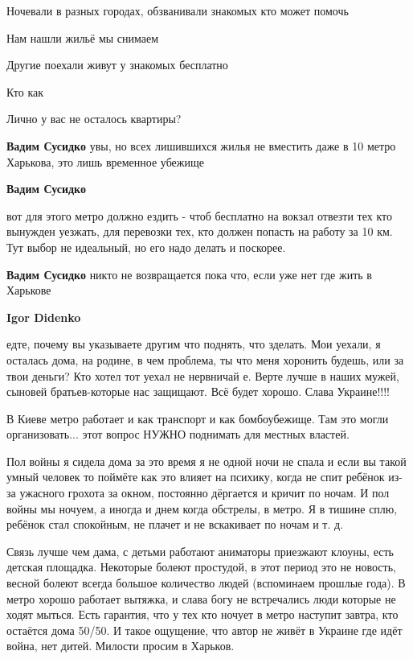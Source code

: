 \begin{itemize}
\begin{itemize}
Ночевали в разных городах, обзванивали знакомых кто может помочь

Нам нашли жильё мы снимаем

Другие поехали живут у знакомых бесплатно

Кто как

Лично у вас не осталось квартиры?

\textbf{Вадим Сусидко} увы, но всех лишившихся жилья не вместить даже в 10 метро Харькова, это лишь временное убежище

\textbf{Вадим Сусидко} 

вот для этого метро должно ездить - чтоб бесплатно на вокзал отвезти тех кто
вынужден уезжать, для перевозки тех, кто должен попасть на работу за 10 км. Тут
выбор не идеальный, но его надо делать и поскорее.

\textbf{Вадим Сусидко} никто не возвращается пока что, если уже нет где жить в Харькове

\textbf{Igor Didenko} 

едте, почему вы указываете другим что поднять, что зделать. Мои уехали, я
осталась дома, на родине, в чем проблема, ты что меня хоронить будешь, или за
твои деньги? Кто хотел тот уехал не нервничай е. Верте лучше в наших мужей,
сыновей братьев-которые нас защищают. Всё будет хорошо. Слава Украине!!!!

\end{itemize} %


В Киеве метро работает и как транспорт и как бомбоубежище. Там это могли
организовать... этот вопрос НУЖНО поднимать для местных властей.


Пол войны я сидела дома за это время я не одной ночи не спала и если вы такой
умный человек то поймёте как это влияет на психику, когда не спит ребёнок из-за
ужасного грохота за окном, постоянно дёргается и кричит по ночам. И пол войны
мы ночуем, а иногда и днем когда обстрелы, в метро. Я в тишине сплю, ребёнок
стал спокойным, не плачет и не вскакивает по ночам и т. д.

Связь лучше чем дама, с детьми работают аниматоры приезжают клоуны, есть
детская площадка. Некоторые болеют простудой, в этот период это не новость,
весной болеют всегда большое количество людей (вспоминаем прошлые года). В
метро хорошо работает вытяжка, и слава богу не встречались люди которые не
ходят мыться. Есть гарантия, что у тех кто ночует в метро наступит завтра, кто
остаётся дома 50/50. И такое ощущение, что автор не живёт в Украине где идёт
война, нет дитей. Милости просим в Харьков.


\end{itemize}
